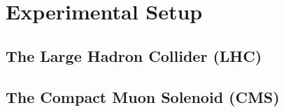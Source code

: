 \chapter{Experimental Setup}
\label{chap::ExperimentalSetup}

\section{The Large Hadron Collider (LHC)}
\section{The Compact Muon Solenoid (CMS)}
